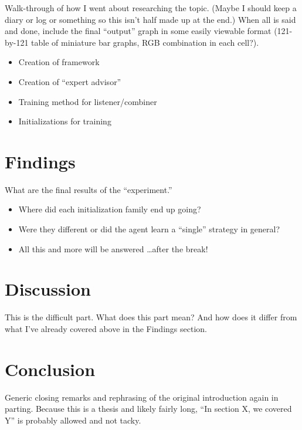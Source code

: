 \documentclass[english]{tktltiki}
\begin{document}
Walk-through of how I went about researching the topic.
%
(Maybe I should keep a diary or log or something so this isn't half made up
at the end.)
%
When all is said and done, include the final ``output'' graph in some easily
viewable format (121-by-121 table of miniature bar graphs, RGB combination in
each cell?).

\begin{itemize}
	\item Creation of framework
	\item Creation of ``expert advisor''
	\item Training method for listener/combiner
	\item Initializations for training
\end{itemize}


\section{Findings}


What are the final results of the ``experiment.''

\begin{itemize}
	\item Where did each initialization family end up going?
	\item Were they different or did the agent learn a ``single'' strategy
		in general?
	\item All this and more will be answered \ldots after the break!
\end{itemize}


\section{Discussion}


This is the difficult part.
%
What does this part mean?
%
And how does it differ from what I've already covered above in the Findings
section.


\section{Conclusion}


Generic closing remarks and rephrasing of the original introduction again
in parting.
%
Because this is a thesis and likely fairly long, ``In section X, we covered Y''
is probably allowed and not tacky.


\nocite{*}






\end{document}
